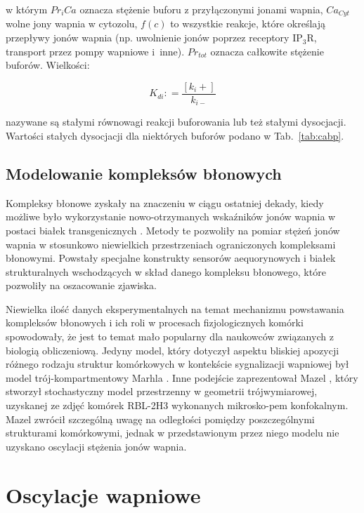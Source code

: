 \noindent w którym $Pr_iCa$  oznacza stężenie buforu z przyłączonymi jonami wapnia, $Ca_{Cyt}$ wolne jony wapnia w cytozolu, $f(c)$ to wszystkie reakcje, które określają przepływy jonów wapnia (np. uwolnienie jonów poprzez receptory IP$_3$R, transport przez pompy wapniowe i~inne). $Pr_{tot}$ oznacza całkowite stężenie buforów.
\noindent Wielkości:

\begin{equation}
K_{di}: = \frac{[k_i+]}{k_{i-}}
\end{equation}

\noindent nazywane są  stałymi równowagi reakcji buforowania lub też stałymi dysocjacji. Wartości stałych dysocjacji dla niektórych buforów podano w Tab.~\ref{tab:cabp}.

\subsection{Modelowanie kompleksów błonowych}

Kompleksy błonowe zyskały na znaczeniu w ciągu ostatniej dekady, kiedy możliwe było wykorzystanie nowo-otrzymanych wskaźników jonów wapnia w postaci białek transgenicznych \cite{Alvarez2002,Brini1993,Cobbold1983,DelaFuente2013,Jung2004,Webb2012}. Metody te  pozwoliły na pomiar stężeń jonów wapnia w stosunkowo niewielkich przestrzeniach ograniczonych kompleksami błonowymi. Powstały specjalne konstrukty sensorów aequorynowych i białek strukturalnych wschodzących w skład danego kompleksu błonowego, które pozwoliły na oszacowanie zjawiska.

Niewielka ilość danych  eksperymentalnych na temat mechanizmu powstawania kompleksów błonowych i ich roli w procesach fizjologicznych komórki spowodowały, że jest to temat mało popularny dla naukowców związanych z biologią obliczeniową. Jedyny model, który dotyczył aspektu bliskiej apozycji różnego rodzaju struktur komórkowych w kontekście sygnalizacji wapniowej był model trój-kompartmentowy Marhla \cite{Marhl2000}.  Inne podejście zaprezentował Mazel \cite{Mazel2009}, który stworzył stochastyczny model  przestrzenny w geometrii trójwymiarowej, uzyskanej ze zdjęć komórek RBL-2H3 wykonanych mikrosko-pem konfokalnym. Mazel zwrócił szczególną uwagę na odległości pomiędzy poszczególnymi strukturami komórkowymi, jednak w przedstawionym przez niego modelu nie uzyskano oscylacji stężenia jonów wapnia.


\section{Oscylacje wapniowe}

